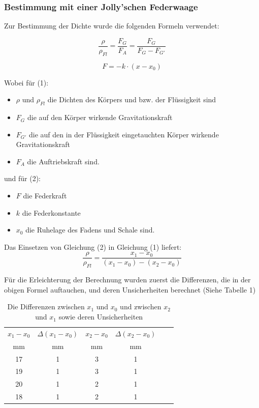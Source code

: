 \documentclass[11pt,a4paper]{article} %
\begin{document}
\subsubsection{Bestimmung mit einer Jolly'schen Federwaage}
Zur Bestimmung der Dichte wurde die folgenden Formeln verwendet:

\begin{equation}
\frac{\rho}{\rho_{Fl}} = \frac{F_{G}}{F_{A}} = \frac{F_G}{F_G - F_{G'}}
\end{equation}

\begin{equation}
F = -k\cdot(x-x_0)
\end{equation}

Wobei für (1):
\begin{itemize}
	\item $\rho$ und $\rho_{Fl}$ die Dichten des Körpers und bzw. der Flüssigkeit sind
	\item $F_G$ die auf den Körper wirkende Gravitationskraft
	\item $F_{G'}$ die auf den in der Flüssigkeit eingetauchten Körper wirkende Gravitationskraft
	\item $F_A$ die Auftriebskraft sind.
\end{itemize}

und für (2):
\begin{itemize}
	\item $F$ die Federkraft
	\item $k$ die Federkonstante
	\item $x_0$ die Ruhelage des Fadens und Schale sind.
\end{itemize}

Das Einsetzen von Gleichung (2) in Gleichung (1) liefert: 
\begin{equation}
\frac{\rho}{\rho_{Fl}} = \frac{x_1-x_0}{(x_1-x_0)-(x_2-x_0)}
\end{equation}

Für die Erleichterung der Berechnung wurden zuerst die Differenzen, die in der obigen Formel auftauchen, und deren Unsicherheiten berechnet (Siehe Tabelle 1)

\begin{table}[h]
	\begin{tabular*}{0.99\textwidth}{@{\extracolsep{\fill}}cccccc}
		\toprule
		$x_1-x_0$ & $\Delta (x_1-x_0)$ &  $x_2-x_0$  &  $\Delta(x_2-x_0)$  \\
		mm & mm &  mm & mm   \\
		\midrule
		17 & 1 & 3 & 1 \\
		19 & 1 & 3 & 1 \\
		20 & 1 & 2 & 1 \\
		18 & 1 & 2 & 1 \\
		
		\bottomrule
	\end{tabular*}
	\caption{Die Differenzen zwischen $x_1$ und $x_0$ und zwischen $x_2$ und $x_1$ sowie deren Unsicherheiten}
	\label{tabelle}
\end{table}
\end{document}
